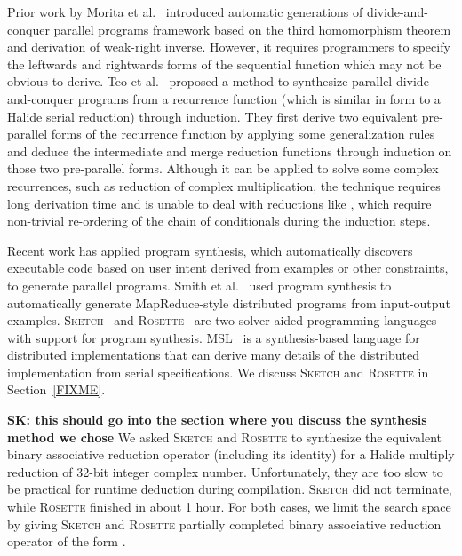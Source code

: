 Prior work by Morita et al.~\cite{Morita:2007:AIG:1250734.1250752} introduced automatic generations of divide-and-conquer parallel programs framework based on the third homomorphism theorem and derivation of weak-right inverse. However, it requires programmers to specify the leftwards and rightwards forms of the sequential function which may not be obvious to derive. Teo et al.~\cite{Teo:1997:DEP:266670.266697} proposed a method to synthesize parallel divide-and-conquer
programs from a recurrence function (which is similar in form to a Halide serial reduction) through induction. They first derive two equivalent pre-parallel forms of the recurrence function by applying some generalization rules and deduce the intermediate and merge reduction functions through induction on those two pre-parallel forms. Although it can be applied to solve some complex recurrences, such as reduction of complex multiplication, the technique requires long derivation time and is unable to deal with reductions like , which require non-trivial re-ordering of the chain of conditionals during the induction steps. 

Recent work has applied program synthesis, which automatically discovers executable code based on user intent derived from examples or other constraints, to generate parallel programs. Smith et al.~\cite{Smith:2016:MPS:2908080.2908102} used program synthesis to automatically generate MapReduce-style distributed programs from input-output examples. \textsc{Sketch}~\cite{Solar-Lezama:2008:PSS:1714168} and \textsc{Rosette}~\cite{Torlak:2013:GSL:2509578.2509586} are two solver-aided programming languages with support for program synthesis.  MSL~\cite{Xu:2014:MSE:2683593.2683628} is a synthesis-based language for distributed implementations that can derive many details of the distributed implementation from serial specifications.  We discuss \textsc{Sketch} and \textsc{Rosette} in Section~\ref{FIXME}.


\textbf{SK: this should go into the section where you discuss the synthesis method we chose} We asked \textsc{Sketch} and \textsc{Rosette} to synthesize the equivalent binary associative reduction operator (including its identity) for a Halide multiply reduction of 32-bit integer complex number. Unfortunately, they are too slow to be practical for runtime deduction during compilation. \textsc{Sketch} did not terminate, while \textsc{Rosette} finished in about 1 hour. For both cases, we limit the search space by giving \textsc{Sketch} and \textsc{Rosette} partially completed binary associative reduction operator of the form . 

